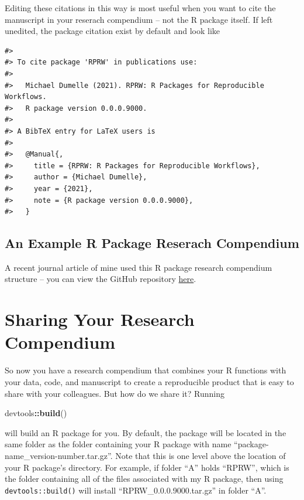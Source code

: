\documentclass[
]{book}
\newenvironment{Shaded}{\begin{snugshade}}{\end{snugshade}}
\newcommand{\KeywordTok}[1]{\textcolor[rgb]{0.13,0.29,0.53}{\textbf{#1}}}
\newcommand{\NormalTok}[1]{#1}
\newcommand{\OperatorTok}[1]{\textcolor[rgb]{0.81,0.36,0.00}{\textbf{#1}}}
\begin{document}
Editing these citations in this way is most useful when you want to cite the manuscript in your reserach compendium -- not the R package itself. If left unedited, the package citation exist by default and look like

\begin{verbatim}
#> 
#> To cite package 'RPRW' in publications use:
#> 
#>   Michael Dumelle (2021). RPRW: R Packages for Reproducible Workflows.
#>   R package version 0.0.0.9000.
#> 
#> A BibTeX entry for LaTeX users is
#> 
#>   @Manual{,
#>     title = {RPRW: R Packages for Reproducible Workflows},
#>     author = {Michael Dumelle},
#>     year = {2021},
#>     note = {R package version 0.0.0.9000},
#>   }
\end{verbatim}

\hypertarget{an-example-r-package-reserach-compendium}{%
\subsection{An Example R Package Reserach Compendium}\label{an-example-r-package-reserach-compendium}}

A recent journal article of mine used this R package research compendium structure -- you can view the GitHub repository \href{https://github.com/michaeldumelle/DumelleEtAl2021STLMM}{here}.

\hypertarget{sharing-your-research-compendium}{%
\section{Sharing Your Research Compendium}\label{sharing-your-research-compendium}}

So now you have a research compendium that combines your R functions with your data, code, and manuscript to create a reproducible product that is easy to share with your colleagues. But how do we share it? Running

\begin{Shaded}
\begin{Highlighting}[]
\NormalTok{devtools}\OperatorTok{::}\KeywordTok{build}\NormalTok{()}
\end{Highlighting}
\end{Shaded}

will build an R package for you. By default, the package will be located in the same folder as the folder containing your R package with name ``package-name\_version-number.tar.gz''. Note that this is one level above the location of your R package's directory. For example, if folder ``A'' holds ``RPRW'', which is the folder containing all of the files associated with my R package, then using \texttt{devtools::build()} will install ``RPRW\_0.0.0.9000.tar.gz'' in folder ``A''.
\end{document}
